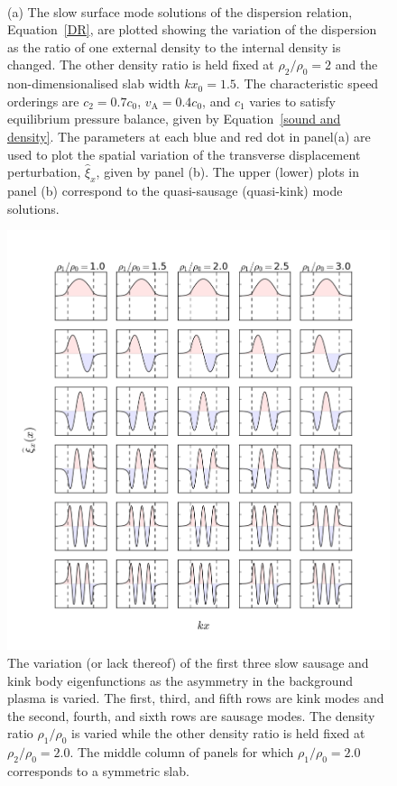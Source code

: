 \documentclass[12pt]{../style-files/ociamthesis}
\begin{document}
\begin{figure} []
	\centering
	 \\
	\caption{(a) The slow surface mode solutions of the dispersion relation, Equation~\eqref{DR}, are plotted showing the variation of the dispersion as the ratio of one external density to the internal density is changed. The other density ratio is held fixed at $\rho_2/\rho_0=2$ and the non-dimensionalised slab width $kx_0 = 1.5$. The characteristic speed orderings are $c_2=0.7c_0$, $v_\textrm{A}=0.4c_0$, and $c_1$ varies to satisfy equilibrium pressure balance, given by Equation~\eqref{sound and density}. The parameters at each blue and red dot in panel(a) are used to plot the spatial variation of the transverse displacement perturbation, $\widehat{\xi}_x$, given by panel (b). The upper (lower) plots in panel (b) correspond to the quasi-sausage (quasi-kink) mode solutions.}
	\label{fig: avoided crossing}
\end{figure}

\begin{figure}
	\centering
	\includegraphics[width=\textwidth]{../main/figures/xi_of_x_slow_body.png}
	\caption{The variation (or lack thereof) of the first three slow sausage and kink body eigenfunctions as the asymmetry in the background plasma is varied. The first, third, and fifth rows are kink modes and the second, fourth, and sixth rows are sausage modes. The density ratio $\rho_1/\rho_0$ is varied while the other density ratio is held fixed at $\rho_2/\rho_0 = 2.0$. The middle column of panels for which $\rho_1/\rho_0 = 2.0$ corresponds to a symmetric slab.}
	\label{fig: body eigenmodes}
\end{figure}
\end{document}
